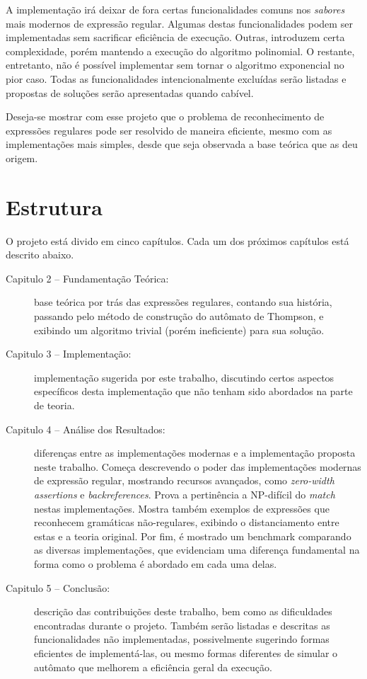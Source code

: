 \documentclass[a4paper,12pt,oneside,onecolumn]{uerj}
\begin{document}
A implementação irá deixar de fora certas funcionalidades comuns nos \emph{sabores} mais modernos de expressão regular. Algumas destas funcionalidades podem ser implementadas sem sacrificar eficiência de execução. Outras, introduzem certa complexidade, porém mantendo a execução do algoritmo polinomial. O restante, entretanto, não é possível implementar sem tornar o algoritmo exponencial no pior caso. Todas as funcionalidades intencionalmente excluídas serão listadas e propostas de soluções serão apresentadas quando cabível.

Deseja-se mostrar com esse projeto que o problema de reconhecimento de expressões regulares pode ser resolvido de maneira eficiente, mesmo com as implementações mais simples, desde que seja observada a base teórica que as deu origem.

\section{Estrutura}

O projeto está divido em cinco capítulos. Cada um dos próximos capítulos está descrito abaixo.

\begin{description}

\item[Capitulo 2 -- Fundamentação Teórica:] base teórica por trás das expressões regulares, contando sua história, passando pelo método de construção do autômato de Thompson, e exibindo um algoritmo trivial (porém ineficiente) para sua solução.

\item[Capitulo 3 -- Implementação:] implementação sugerida por este trabalho, discutindo certos aspectos específicos desta implementação que não tenham sido abordados na parte de teoria. 

\item[Capitulo 4 -- Análise dos Resultados:] diferenças entre as implementações modernas e a implementação proposta neste trabalho. Começa descrevendo o poder das implementações modernas de expressão regular, mostrando recursos avançados, como \emph{zero-width assertions} e \emph{backreferences}. Prova a pertinência a NP-difícil do \emph{match} nestas implementações. Mostra também exemplos de expressões que reconhecem gramáticas não-regulares, exibindo o distanciamento entre estas e a teoria original. Por fim, é mostrado um benchmark comparando as diversas implementações, que evidenciam uma diferença fundamental na forma como o problema é abordado em cada uma delas. 

\item[Capitulo 5 -- Conclusão:] descrição das contribuições deste trabalho, bem como as dificuldades encontradas durante o projeto. Também serão listadas e descritas as funcionalidades não implementadas, possivelmente sugerindo formas eficientes de implementá-las, ou mesmo formas diferentes de simular o autômato que melhorem a eficiência geral da execução. 

\end{description}
\end{document}
